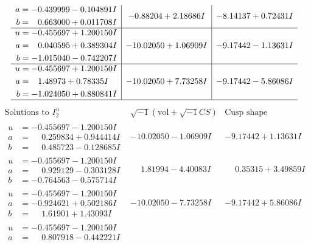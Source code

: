 \documentclass[1p]{elsarticle_modified}
\theoremstyle{definition}
\newcommand{\I}{\sqrt{-1}}
\begin{document}
$$\begin{array}{c|c|c}
\begin{aligned}
a &= -0.439999 - 0.104891 I \\
b &= \phantom{-}0.663000 + 0.011708 I\end{aligned}
 & -0.88204 + 2.18686 I & -8.14137 + 0.72431 I \\ \hline\begin{aligned}
u &= -0.455697 + 1.200150 I \\
a &= \phantom{-}0.040595 + 0.389304 I \\
b &= -1.015040 - 0.742207 I\end{aligned}
 & -10.02050 + 1.06909 I & -9.17442 - 1.13631 I \\ \hline\begin{aligned}
u &= -0.455697 + 1.200150 I \\
a &= \phantom{-}1.48973 + 0.78335 I \\
b &= -1.024050 + 0.880841 I\end{aligned}
 & -10.02050 + 7.73258 I & -9.17442 - 5.86086 I\\
 \hline 
 \end{array}$$\newpage$$\begin{array}{c|c|c}  
\text{Solutions to }I^u_{2}& \I (\text{vol} + \sqrt{-1}CS) & \text{Cusp shape}\\
 \hline 
\begin{aligned}
u &= -0.455697 - 1.200150 I \\
a &= \phantom{-}0.259834 + 0.944414 I \\
b &= \phantom{-}0.485723 - 0.128685 I\end{aligned}
 & -10.02050 - 1.06909 I & -9.17442 + 1.13631 I \\ \hline\begin{aligned}
u &= -0.455697 - 1.200150 I \\
a &= \phantom{-}0.929129 - 0.303128 I \\
b &= -0.764563 - 0.575714 I\end{aligned}
 & \phantom{-}1.81994 - 4.40083 I & \phantom{-}0.35315 + 3.49859 I \\ \hline\begin{aligned}
u &= -0.455697 - 1.200150 I \\
a &= -0.924621 + 0.502186 I \\
b &= \phantom{-}1.61901 + 1.43093 I\end{aligned}
 & -10.02050 - 7.73258 I & -9.17442 + 5.86086 I \\ \hline\begin{aligned}
u &= -0.455697 - 1.200150 I \\
a &= \phantom{-}0.807918 - 0.442221 I \\

\end{aligned}
\end{array}$$
\end{document}
